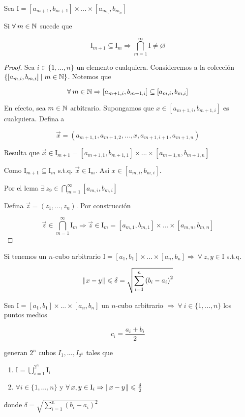 \begin{lemma}
    Sea $\mathrm{I} = [a_{m+1}, b_{m+1}] \times ... \times [a_{m_n},b_{m_n}]$

    Si $\forall \: m \in \mathbb{N} $ sucede que 

    $$\mathrm{I}_{m+1} \subseteq \mathrm{I}_{m} \Rightarrow \bigcap_{m=1}^{\infty} \mathrm{I} \neq \varnothing$$
\end{lemma}

\begin{proof}
    Sea $i \in \{1, ..., n \}$ un elemento cualquiera. Consideremos a la colección $\{ [a_{m, i},b_{m, i}] \mid m \in \mathbb{N} \}$. Notemos que

    $$\forall \: m \in \mathbb{N} \Rightarrow [a_{{m+1, i}},b_{{m+1, i}}] \subseteq [a_{m, i},b_{m, i}]$$

    En efecto, sea $m \in \mathbb{N}$ arbitrario. Supongamos que $x \in [a_{{m+1, i}},b_{{m+1, i}}]$ es cualquiera. Defina a 

    $$\vec{x} = (a_{{m+1, 1}}, a_{{m+1, 2}}, ..., x, a_{{m+1, i+1}}, a_{{m+1, n}})$$

    Resulta que $\vec{x} \in \mathrm{I}_{m+1} = [a_{{m+1, 1}},b_{{m+1, 1}}] \times ... \times [a_{{m+1, n}},b_{{m+1, n}}]$

    Como $\mathrm{I}_{m+1} \subseteq \mathrm{I}_{m}$ s.t.q. $\vec{x} \in \mathrm{I}_{m}$. Así $x \in [a_{m, i},b_{m, i}]$. 

    Por el lema  $\exists \: z_9 \in \bigcap_{m=1}^{\infty}  [a_{m, i},b_{m, i}]$ 

    Defina $\vec{z} = (z_1, ..., z_n)$. Por construcción

    $$\vec{z} \in \bigcap_{m=1}^{\infty} \mathrm{I}_{m} \Rightarrow \vec{z} \in \mathrm{I}_{m} = [a_{m, 1},b_{m, 1}] \times ... \times [a_{m, n},b_{m, n}]$$
\end{proof}

\begin{lemma}
    Si tenemos un $n$-cubo arbitrario $\mathrm{I} = [a_{1},b_{1}] \times ... \times [a_{n},b_{n}] \Rightarrow \: \forall \: z,y \in \mathrm{I}$ s.t.q.

    $$\norm{x-y} \leqslant \delta = \sqrt{\sum_{i=1}^{n}{(b_i-a_i)}^{2}}$$
\end{lemma}

\begin{lemma} \label{lemma334}
    Sea $\mathrm{I} = [a_{1},b_{1}] \times ... \times [a_{n},b_{n}]$  un $n$-cubo arbitrario $\Rightarrow \: \forall \: i \in \{1, ..., n \}$ los puntos medios

    $$c_i = \frac{a_i+b_i}{2}$$

    generan $2^n$ cubos $I_1, ..., I_{2^n}$ tales que

    \begin{enumerate}
        \item $\mathrm{I} = \bigcup\limits_{i=1}^{2^n} \mathrm{I}_{i}$
        \item $\forall i  \in \{1, ..., n \}$ y $\forall \: x,y \in \mathrm{I}_{i} \Rightarrow \norm{x-y} \leqslant \frac{\delta}{2}$
    \end{enumerate}

    donde $\delta = \sqrt{\sum\limits_{i=1}^{n}{(b_i-a_i)}^{2}}$
\end{lemma}

